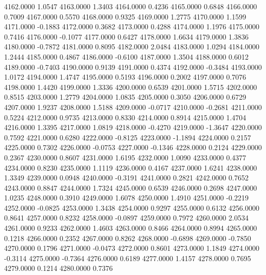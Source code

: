 4162.0000      1.0547
4163.0000      1.3403
4164.0000      0.4236
4165.0000      0.6848
4166.0000      0.7009
4167.0000      0.5570
4168.0000      0.9325
4169.0000      1.2775
4170.0000      1.1599
4171.0000     -0.1883
4172.0000      0.3682
4173.0000      0.4288
4174.0000      1.1976
4175.0000      0.7416
4176.0000     -0.1077
4177.0000      0.6427
4178.0000      1.6634
4179.0000      1.3836
4180.0000     -0.7872
4181.0000      0.8095
4182.0000      2.0484
4183.0000      1.0294
4184.0000      1.2444
4185.0000      0.4867
4186.0000     -0.6100
4187.0000      1.3504
4188.0000      0.6012
4189.0000     -0.7403
4190.0000      0.9139
4191.0000      0.4374
4192.0000     -0.3484
4193.0000      1.0172
4194.0000      1.4747
4195.0000      0.5193
4196.0000      0.2002
4197.0000      0.7076
4198.0000      1.4420
4199.0000      1.3336
4200.0000      0.6539
4201.0000      1.5715
4202.0000      0.8515
4203.0000      1.2779
4204.0000      1.0835
4205.0000      0.3050
4206.0000      0.6729
4207.0000      1.9237
4208.0000      1.5188
4209.0000     -0.0717
4210.0000     -0.2681
4211.0000      0.5224
4212.0000      0.9735
4213.0000      0.8330
4214.0000      0.8914
4215.0000      1.4704
4216.0000      1.3395
4217.0000      1.0819
4218.0000     -0.4270
4219.0000     -1.3647
4220.0000      0.7592
4221.0000      0.6280
4222.0000     -0.8125
4223.0000     -1.1894
4224.0000      0.2157
4225.0000      0.7302
4226.0000     -0.0753
4227.0000     -0.1346
4228.0000      0.2124
4229.0000      0.2367
4230.0000      0.8607
4231.0000      1.6195
4232.0000      1.0090
4233.0000      0.4377
4234.0000      0.8230
4235.0000      1.1119
4236.0000      0.4167
4237.0000      1.6241
4238.0000      1.3349
4239.0000      0.0948
4240.0000     -0.3191
4241.0000      0.2821
4242.0000      0.7652
4243.0000      0.8847
4244.0000      1.7324
4245.0000      0.6539
4246.0000      0.2698
4247.0000      1.0235
4248.0000      0.3910
4249.0000      1.6078
4250.0000      1.4910
4251.0000     -0.2219
4252.0000     -0.0825
4253.0000      1.3438
4254.0000      0.9297
4255.0000      0.6132
4256.0000      0.8641
4257.0000      0.8232
4258.0000     -0.0897
4259.0000      0.7972
4260.0000      2.0534
4261.0000      0.9233
4262.0000      1.4603
4263.0000      0.8466
4264.0000      0.8994
4265.0000      0.1218
4266.0000      0.2352
4267.0000      0.8262
4268.0000     -0.6898
4269.0000     -0.7850
4270.0000      0.1796
4271.0000     -0.0473
4272.0000      0.8601
4273.0000      1.1849
4274.0000     -0.3114
4275.0000     -0.7364
4276.0000      0.6189
4277.0000      1.4157
4278.0000      0.7695
4279.0000      0.1214
4280.0000      0.7376

